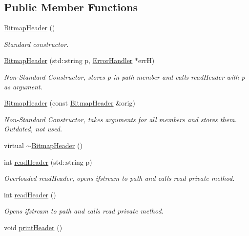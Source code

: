 \subsection*{Public Member Functions}
\begin{DoxyCompactItemize}
\item 
\mbox{\hyperlink{classBitmapHeader_a216e4a8485db7865be70c996f37e4c7d}{Bitmap\+Header}} ()
\begin{DoxyCompactList}\small\item\em Standard constructor. \end{DoxyCompactList}\item 
\mbox{\hyperlink{classBitmapHeader_a2cf57f049eae7d2ee93d5749d678aca5}{Bitmap\+Header}} (std\+::string p, \mbox{\hyperlink{classErrorHandler}{Error\+Handler}} $\ast$errH)
\begin{DoxyCompactList}\small\item\em Non-\/\+Standard Constructor, stores p in path member and calls read\+Header with p as argument. \end{DoxyCompactList}\item 
\mbox{\hyperlink{classBitmapHeader_a25a5481f49d70a8c42a9efc17f17fd48}{Bitmap\+Header}} (const \mbox{\hyperlink{classBitmapHeader}{Bitmap\+Header}} \&orig)
\begin{DoxyCompactList}\small\item\em Non-\/\+Standard Constructor, takes arguments for all members and stores them. Outdated, not used. \end{DoxyCompactList}\item 
virtual \mbox{\hyperlink{classBitmapHeader_a4e102d5fe9a8619fca7319b148ec23d1}{$\sim$\+Bitmap\+Header}} ()
\item 
int \mbox{\hyperlink{classBitmapHeader_a2de360d5111136167f5885bed561bc8c}{read\+Header}} (std\+::string p)
\begin{DoxyCompactList}\small\item\em Overloaded read\+Header, opens ifstream to path and calls read private method. \end{DoxyCompactList}\item 
int \mbox{\hyperlink{classBitmapHeader_a66adc11592dc1d18edbd46bade1db242}{read\+Header}} ()
\begin{DoxyCompactList}\small\item\em Opens ifstream to path and calls read private method. \end{DoxyCompactList}\item 
void \mbox{\hyperlink{classBitmapHeader_a72e26bdf3269d382dfbdc76119c1a6aa}{print\+Header}} ()

\end{DoxyCompactItemize}
